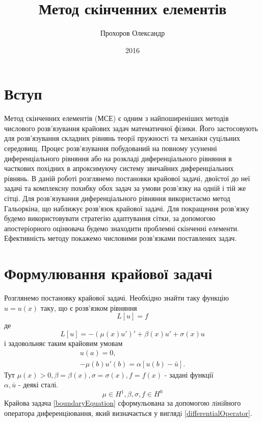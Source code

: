 \documentclass[a4paper]{article}
\title{Метод скінченних елементів}
\author{Прохоров Олександр}
\date{2016}
\numberwithin{equation}{section}
\begin{document}
\hfill
\tableofcontents
\newpage
\section{Вступ}
Метод скінченних елементів (МСЕ) є одним з найпоширеніших методів числового розв’язування крайових задач математичної фізики. Його застосовують для розв’язування складних рiвнянь теорiї пружностi та механiки суцiльних середовищ. Процес розв’язування побудований на повному усуненні диференціального рівняння або на розкладі диференціального рівняння в часткових похід\-них в апроксимуючу систему звичайних диференціальних рівнянь.
В даній роботі розглянемо постановки крайової задачі, двоїстої до неї задачі та комплексну похибку обох задач за умови розв'язку на одній і тій же сітці.
Для розв’язування диференці\-ального рівняння використаємо метод Гальоркіна, що наближує розв’язок крайової задачі. Для покращення розв’язку будемо використовувати стратегію адаптування сітки, за допомогою апосте\-ріорного оцінювача будемо знаходити проблемні скінченні елементи. Ефективність методу покаже\-мо числовими розв’язками поставлених задач.
\section{Формулювання крайової задачі}
Розглянемо постановку крайової задачі. Необхідно знайти таку функцію $u=u(x)$ таку, що є розв’язком рівняння
\begin{equation}\label{boundaryEquation}
L[u]=f
\end{equation}
де
\begin{equation}\label{differentialOperator}
L[u]=-(\mu(x)u')'+\beta(x)u'+\sigma(x)u
\end{equation}
і задовольняє таким крайовим умовам
\begin{equation}\label{boundaryCondition}
\begin{split}
u(a)=0,\\
-\mu(b)u'(b)=\alpha[u(b)-\bar{u}].
\end{split}
\end{equation}
Тут $\mu(x)>0, \beta=\beta(x), \sigma=\sigma(x),f=f(x)$ - задані функції\\
$\alpha, \bar{u}$ - деякі сталі.
\begin{equation}
\mu \in H^1, \beta, \sigma, f\in H^0
\end{equation}
Крайова задача \ref{boundaryEquation} сформульована за допомогою лiнiйного оператора диференцiювання, який визначається у виглядi \ref{differentialOperator}.
\end{document}
